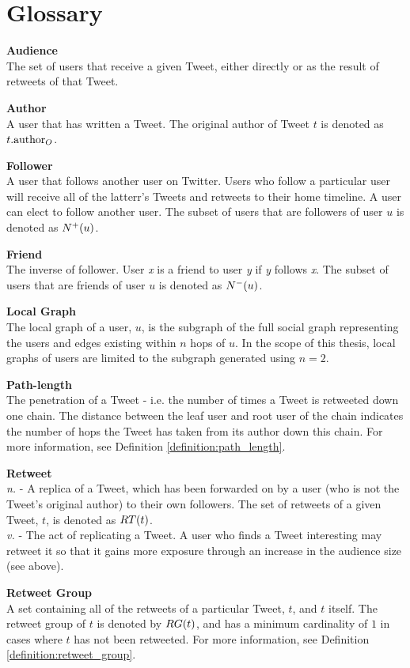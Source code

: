 \chapter*{Glossary} 

{\bf Audience}\\
The set of users that receive a given Tweet, either directly or as the result of retweets of that Tweet.

{\bf Author}\\
A user that has written a Tweet. The original author of Tweet $t$ is denoted as $t.\textrm{author}_O$. 

{\bf Follower}\\
A user that follows another user on Twitter. Users who follow a particular user will receive all of the latterr's Tweets and retweets to their home timeline. A user can elect to follow another user. The subset of users that are followers of user $u$ is denoted as $N^+(u)$.

{\bf Friend}\\
The inverse of follower. User \textit{x} is a friend to user \textit{y} if \textit{y} follows \textit{x}. The subset of users that are friends of user $u$ is denoted as $N^-(u)$.

{\bf Local Graph}\\
The local graph of a user, $u$, is the subgraph of the full social graph representing the users and edges existing within $n$ hops of $u$. In the scope of this thesis, local graphs of users are limited to the subgraph generated using $n=2$.

{\bf Path-length}\\
The penetration of a Tweet - i.e. the number of times a Tweet is retweeted down one chain. The distance between the leaf user and root user of the chain indicates the number of hops the Tweet has taken from its author down this chain. For more information, see Definition \ref{definition:path_length}.
			
{\bf Retweet}\\
\textit{n.} - A replica of a Tweet, which has been forwarded on by a user (who is not the Tweet's original author) to their own followers. The set of retweets of a given Tweet, $t$, is denoted as $RT(t)$.\\
\textit{v.} - The act of replicating a Tweet. A user who finds a Tweet interesting may retweet it so that it gains more exposure through an increase in the audience size (see above).
									
{\bf Retweet Group}\\
A set containing all of the retweets of a particular Tweet, $t$, and $t$ itself. The retweet group of $t$ is denoted by $RG(t)$, and has a minimum cardinality of $1$ in cases where $t$ has not been retweeted. For more information, see Definition \ref{definition:retweet_group}.

